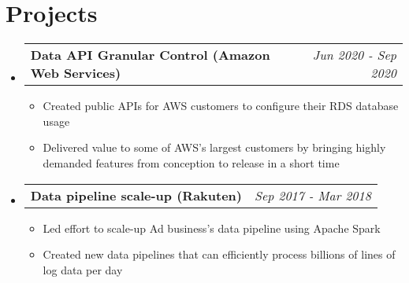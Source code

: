 \documentclass[letterpaper,11pt]{article}
\makeatletter
\newcommand{\bulletItem}[1]{
  \item\small{
    {#1 \vspace{-2pt}}
  }
}
\newcommand{\resumeProject}[2]{
  \vspace{-1pt}\item[]
    \begin{tabular*}{0.97\textwidth}[t]{l@{\extracolsep{\fill}}r}
      \textbf{#1} & \textit{\small #2} \\
    \end{tabular*}\vspace{0pt}
}
\newcommand{\resumeSubHeadingListStart}{\begin{itemize}[leftmargin=0pt]}
\newcommand{\resumeSubHeadingListEnd}{\end{itemize}}
\makeatother
\begin{document}
\section{Projects}

  \resumeSubHeadingListStart
    \resumeProject{Data API Granular Control (Amazon Web Services)}{Jun 2020 - Sep 2020}
    \begin{itemize} 
      \bulletItem{Created public APIs for AWS customers to configure their RDS database usage}
      \bulletItem{Delivered value to some of AWS's largest customers by bringing highly demanded features from conception to release in a short time}
    \end{itemize}

  \resumeProject{Data pipeline scale-up (Rakuten)}{Sep 2017 - Mar 2018}
    \begin{itemize} 
      \bulletItem{Led effort to scale-up Ad business's data pipeline using Apache Spark}
      \bulletItem{Created new data pipelines that can efficiently process billions of lines of log data per day}
    \end{itemize}
  \resumeSubHeadingListEnd
\end{document}
